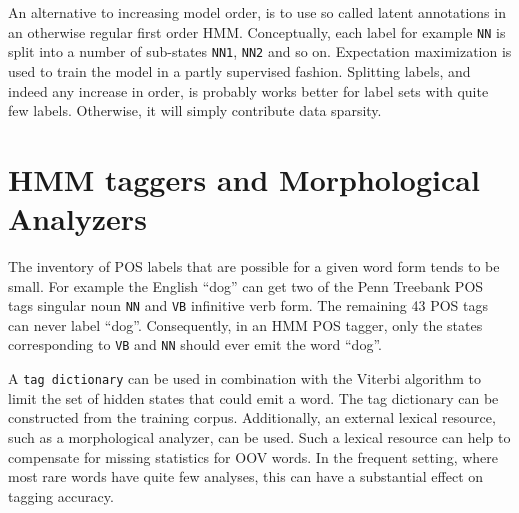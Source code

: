 An alternative to increasing model order, is to use so called latent
annotations \citep{Huang2009} in an otherwise regular first order
HMM. Conceptually, each label for example {\tt NN} is split into a
number of sub-states {\tt NN1}, {\tt NN2} and so on. Expectation
maximization is used to train the model in a partly supervised
fashion. Splitting labels, and indeed any increase in order, is
probably works better for label sets with quite few labels. Otherwise,
it will simply contribute data sparsity.


\section{HMM taggers and Morphological Analyzers}
\label{sec:hmm-label-dict}

The inventory of POS labels that are possible for a given word form
tends to be small. For example the English ``dog'' can get two of the
Penn Treebank POS tags singular noun {\tt NN} and {\tt VB} infinitive
verb form. The remaining 43 POS tags can never label
``dog''. Consequently, in an HMM POS tagger, only the states
corresponding to {\tt VB} and {\tt NN} should ever emit the word
``dog''.

A {\tt tag dictionary} \citep{Brants2000} can be used in combination
with the Viterbi algorithm to limit the set of hidden states that
could emit a word. The tag dictionary can be constructed from the
training corpus. Additionally, an external lexical resource, such as a
morphological analyzer, can be used. Such a lexical resource can help
to compensate for missing statistics for OOV words. In the frequent
setting, where most rare words have quite few analyses, this can have
a substantial effect on tagging accuracy.

